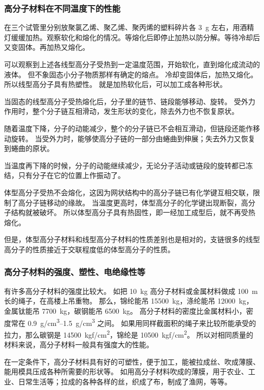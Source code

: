 \subsubsection{高分子材料在不同温度下的性能}
\begin{Experiment}
在三个试管里分别放聚氯乙烯、聚乙烯、聚丙烯的塑料碎片各 \qty{3}{g} 左右，用酒精灯缓缓加热。观察软化和熔化的情况。等熔化后即停止加热以防分解。等待冷却后又变固体。再加热又熔化。  
\end{Experiment}

可以观察到上述各线型高分子受热到一定温度范围，开始软化，直到熔化成流动的液体。
但不象固态小分子物质那样有确定的熔点。
冷却变固体后，加热又熔化。
所以线型高分子具有热塑性。
就是加热软化后，可以加工成各种形状。

当固态的线型高分子受热熔化后，分子里的链节、链段能够移动、旋转。
受外力作用时，整个分子链互相滑动，发生形状的变化，除去外力也不恢复原状。

随着温度下降，分子的动能减少，整个的分子链已不会相互滑动，但链段还能作移动旋转。
当受外力时，能够使高分子链的一部分由蜷曲到伸展；失去外力又恢复到蜷曲的原状。

当温度再下降的时候，分子的动能继续减少，无论分子活动或链段的旋转都已冻结，只有分子在它的位置上作振动了。

体型高分子受热不会熔化，这因为网状结构中的高分子链已有化学键互相交联，限制了高分子链移动的缘故。
当温度更高时，体型高分子的化学键出现断裂，高分子结构就被破坏。
所以体型高分子具有热固性，即一经加工成型后，就不再受热熔化。

但是，体型高分子材料和线型高分子材料的性质差别也是相对的，支链很多的线型高分子的性质接近于交联程度低的体型高分子的性质。

\subsubsection{高分子材料的强度、塑性、电绝缘性等}
有许多高分子材料的强度比较大。
如把 \qty{10}{kg} 高分子材料或金属材料做成 \qty{100}{m} 长的绳子，在高楼上吊重物。
那么，锦纶能吊 \qty{15500}{kg}，涤纶能吊 \qty{12000}{kg}，金属钛能吊 \qty{7700}{kg}，碳钢能吊 \qty{6500}{kg}。
高分子材料的密度比金属材料小，密度常在 \qtyrange{0.9}{1.5}{g/cm^3} 之间。
如果用同样截面积的绳子来比较所能承受的拉力，那么碳钢是 \qty{14500}{kgf/cm^2}，锦纶是 \qty{10500}{kgf/cm^2}。
所以对相同质量的材料来说，高分子材料一般具有强度大的性能。

在一定条件下，高分子材料具有好的可塑性，便于加工，能被拉成丝、吹成薄膜、能用模具压成各种所需要的形状等。
如用高分子材料吹成的薄膜，用于农业、工业、日常生活等；拉成的各种各样的丝，织成了布，制成了渔网，等等。

